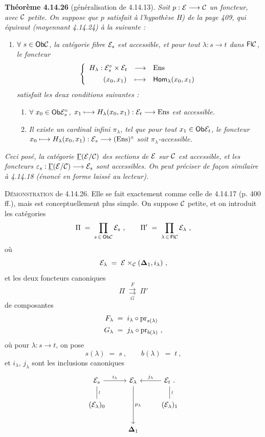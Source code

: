 \textbf{Théorème 4.14.26} (généralisation de 4.14.13). \textit{Soit $p : \mathcal{E} \longrightarrow \mathcal{C}$ un foncteur, avec $\mathcal{C}$ petite. On suppose que $p$ satisfait à l'hypothèse H) de la page 409, qui équivaut (moyennant 4.14.24) à la suivante :}
\begin{enumerate}
\item[\textit{H$'$)}] \textit{$\forall\ s \in \mathsf{Ob}\mathcal{C}$, la catégorie fibre $\mathcal{E}_s$ est accessible, et pour tout $\lambda : s \longrightarrow t$ dans $\mathsf{Fl}\mathcal{C}$, le foncteur}
\[
\left\{
\begin{array}{lcl}
H_\lambda : \mathcal{E}_s^\circ \times \mathcal{E}_t & \longrightarrow & \mathrm{Ens}\\[1ex]
\qquad (x_0,x_1) & \longmapsto & \mathsf{Hom}_\lambda(x_0,x_1)
\end{array}
\right.
\]
\textit{satisfait les deux conditions suivantes :}
\begin{enumerate}
\item[\textit{a)}] \textit{$\forall\ x_0 \in \mathsf{Ob}\mathcal{E}_s^\circ$, $x_1 \longmapsto H_\lambda(x_0,x_1) : \mathcal{E}_t \longrightarrow \mathrm{Ens}$ est accessible.}
\item[\textit{b)}] \textit{Il existe un cardinal infini $\pi_\lambda$, tel que pour tout $x_1 \in \mathsf{Ob}\mathcal{E}_t$, le foncteur $x_0 \longmapsto H_\lambda(x_0,x_1) : \mathcal{E}_s \longrightarrow (\mathrm{Ens})^\circ$ soit $\pi_\lambda$-accessible.}
\end{enumerate}
\end{enumerate}
\textit{Ceci posé, la catégorie $\underline{\Gamma}(\mathcal{E}/\mathcal{C})$ des sections de $\mathcal{E}$ sur $\mathcal{C}$ est accessible, et les foncteurs $\varepsilon_s : \underline{\Gamma}(\mathcal{E}/\mathcal{C}) \longrightarrow \mathcal{E}_s$ sont accessibles. On peut préciser de façon similaire à 4.14.18 (énoncé en forme laissé au lecteur).}

\textsc{Démonstration} de 4.14.26. Elle se fait exactement comme celle de 4.14.17 (p. 400 ff.), mais est conceptuellement plus simple. On suppose $\mathcal{C}$ petite, et on introduit les catégories
\[
\Pi \;=\; \prod_{s\,\in\,\mathsf{Ob}\mathcal{C}} \mathcal{E}_s\ , \qquad \Pi' \;=\; \prod_{\lambda\,\in\,\mathsf{Fl}\mathcal{C}} \mathcal{E}_\lambda\ ,
\]
où
\[
\mathcal{E}_\lambda \;=\; \mathcal{E} \times_{\mathcal{C}} (\mathbf{\Delta}_1, i_\lambda)\ ,
\]
et les deux foncteurs canoniques
\[
\Pi \;\underset{G}{\overset{F}{\rightrightarrows}}\; \Pi'
\]
de composantes
\[
\begin{aligned}
F_\lambda \;&=\; i_\lambda \circ \mathrm{pr}_{s(\lambda)}\\
G_\lambda \;&=\; j_\lambda \circ \mathrm{pr}_{b(\lambda)}\ ,
\end{aligned}
\]
où pour $\lambda : s \longrightarrow t$, on pose
\[
s(\lambda) \;=\; s\ , \qquad b(\lambda) \;=\; t\ ,
\]
et $i_\lambda$, $j_\lambda$ sont les inclusions canoniques
\[
\begin{tikzcd}
\cE_s \arrow[r,"i_\lambda"] \arrow[d,dash,"\wr"] & \cE_\lambda \arrow[dd,"p_\lambda"] & \cE_t\ . \arrow[l,"j_\lambda"'] \arrow[d,dash,"\wr"] \\
(\cE_\lambda)_0 & & (\cE_\lambda)_1 \\
& \mathbf{\Delta}_1 &
\end{tikzcd}
\]


